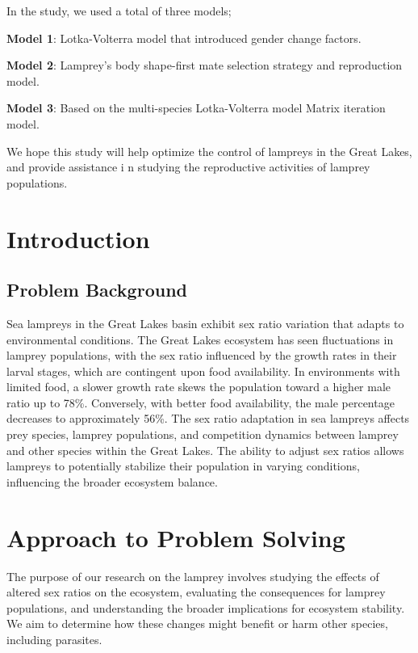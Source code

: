 \documentclass[12pt]{article}
\begin{document}
In the study, we used a total of three models;

\textbf{Model 1}: Lotka-Volterra model that introduced gender change factors.

\textbf{Model 2}: Lamprey's body shape-first mate selection strategy and reproduction model.

\textbf{Model 3}: Based on the multi-species Lotka-Volterra model Matrix iteration model. 

We hope this study will help optimize the control of lampreys in the Great Lakes, and provide assistance i
n studying the reproductive activities of lamprey populations.
\newpage
\tableofcontents
\newpage
\clearpage
\pagestyle{fancy}
\newpage
\setcounter{page}{1}


\section{Introduction}
\subsection{Problem Background}

Sea lampreys in the Great Lakes basin exhibit sex ratio variation that adapts to environmental conditions.
The Great Lakes ecosystem has seen fluctuations in lamprey populations, with the sex ratio influenced by
the growth rates in their larval stages, which are contingent upon food availability. In environments with
limited food, a slower growth rate skews the population toward a higher male ratio up to 78\%. Conversely,
with better food availability, the male percentage decreases to approximately 56\%. The sex ratio adaptation
in sea lampreys affects prey species, lamprey populations, and competition dynamics between lamprey and other
species within the Great Lakes. The ability to adjust sex ratios allows lampreys to potentially stabilize
their population in varying conditions, influencing the broader ecosystem balance.

\section{Approach to Problem Solving}

The purpose of our research on the lamprey involves studying the effects of altered sex ratios on the ecosystem,
evaluating the consequences for lamprey populations, and understanding the broader implications for ecosystem
stability. We aim to determine how these changes might benefit or harm other species, including parasites.
\end{document}
